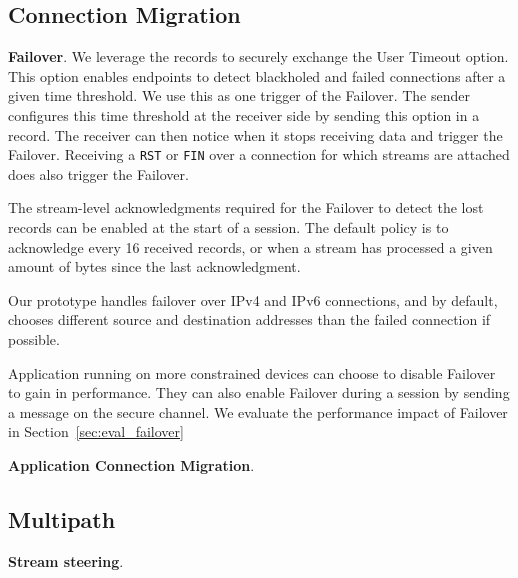 
\subsection{Connection Migration}
\label{sec:prot-migration}

\textbf{Failover}.
We leverage the \tcpls records to securely exchange the \tcp User Timeout option.
This option enables endpoints to detect blackholed and failed \tcp connections
after a given time threshold. We use this as one trigger of the Failover. The 
sender configures this time threshold at the receiver side by sending this \tcp 
option in a \tcpls record. The receiver can then notice when it stops receiving 
data and trigger the Failover.
Receiving a \tcp \texttt{RST} or \texttt{FIN} over a \tcp connection for which
\tcpls streams are attached does also trigger the Failover.

The stream-level acknowledgments required for the Failover to detect the lost
\tcpls records can be enabled at the start of a \tcpls session. The default
policy is to acknowledge every 16 received records, or when a
stream has processed 
a given amount of 
bytes since the last acknowledgment. 

Our prototype handles failover over IPv4 and IPv6 \tcp connections, and by default, chooses different source and destination addresses than the failed \tcp connection if possible.

Application running on more constrained devices can choose to disable Failover
to gain in performance. They can also enable Failover during a \tcpls session 
by sending a message on the secure channel. 
We evaluate the performance impact of Failover in 
Section~\ref{sec:eval_failover}

\textbf{Application Connection Migration}.

\subsection{Multipath}
\label{sec:prot-multipath}

\textbf{Stream steering}.


